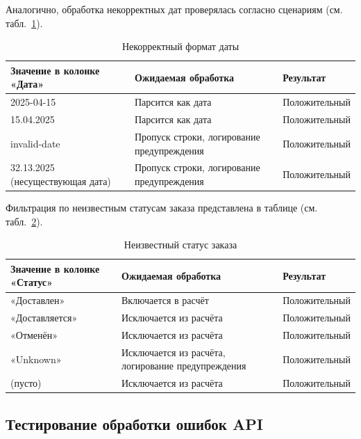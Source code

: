 Аналогично, обработка некорректных дат проверялась согласно сценариям (см. табл.~\ref{tab:stressInvalidDate}).

\begin{table}[!htb]
\caption{\label{tab:stressInvalidDate}Некорректный формат даты}
\small
\begin{center}
\vspace{-0.5cm}\begin{tabular}{|p{4cm}|p{8cm}|p{3cm}|}
\hline
Значение в колонке «Дата» & Ожидаемая обработка & Результат \\ \hline
2025-04-15 & Парсится как дата & Положительный \\ \hline
15.04.2025 & Парсится как дата & Положительный \\ \hline
invalid-date & Пропуск строки, логирование предупреждения & Положительный \\ \hline
32.13.2025 (несуществующая дата) & Пропуск строки, логирование предупреждения & Положительный \\ \hline
\end{tabular}
\end{center}
\end{table}

Фильтрация по неизвестным статусам заказа представлена в таблице (см. табл.~\ref{tab:stressUnknownStatus}).

\begin{table}[!htb]
\caption{\label{tab:stressUnknownStatus}Неизвестный статус заказа}
\small
\begin{center}
\vspace{-0.5cm}\begin{tabular}{|p{4cm}|p{8cm}|p{3cm}|}
\hline
Значение в колонке «Статус» & Ожидаемая обработка & Результат \\ \hline
«Доставлен» & Включается в расчёт & Положительный \\ \hline
«Доставляется» & Исключается из расчёта & Положительный \\ \hline
«Отменён» & Исключается из расчёта & Положительный \\ \hline
«Unknown» & Исключается из расчёта, логирование предупреждения & Положительный \\ \hline
(пусто) & Исключается из расчёта & Положительный \\ \hline
\end{tabular}
\end{center}
\end{table}

\subsection{Тестирование обработки ошибок API}

